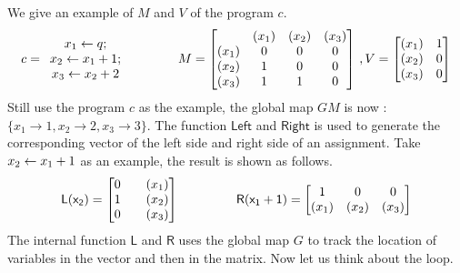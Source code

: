 \documentclass[a4paper,11pt]{article}
\begin{document}
We give an example of $M$ and $V$ of the program $c$.   
$$
c= \begin{array}{c}
\assign {x_1} {q} ;        \\
\assign {x_2} {x_1+1} ;\\
\assign {x_3} {x_2+2} 
\end{array}~~~~~~~~~~~~
M =  \left[ \begin{matrix}
 & (x_1) & (x_2) & (x_3) \\
(x_1) & 0 & 0 & 0 \\
(x_2) & 1 & 0 & 0 \\
(x_3) & 1 & 1 & 0 \\
\end{matrix} \right] ~ , V = \left [ \begin{matrix}
(x_1) &  1 \\
(x_2) & 0 \\
(x_3) & 0 \\
\end{matrix} \right ]
$$
Still use the program $c$ as the example, the global map $GM$ is now : $ \{ x_1 \to 1, x_2 \to 2, x_3 \to 3 \} $. 
The function $\mathsf{Left}$ and $\mathsf{Right}$ is used to generate the corresponding vector of the left side and right side of an assignment. Take $\mathrel{ x_2 \leftarrow x_1+1 } $ as an example, the result is shown as follows.
\[
\sf{L}(x_2) = \left[ \begin{matrix}
 0  & ~~~(x_1) \\
 1 & ~~~(x_2) \\
 0 & ~~~(x_3) \\
\end{matrix}   \right ] ~~~~~~~~~~~~~~
\sf{R} (x_1+1) = \left[ \begin{matrix} 
   1 & 0 & 0 \\
   (x_1) & (x_2) & (x_3) \\
\end{matrix}  \right]
\]
The internal function $\mathsf{L}$ and $\mathsf{R}$ uses the global map $G$ to track the location of variables in the vector and then in the matrix. Now let us think about the loop.
\end{document}
